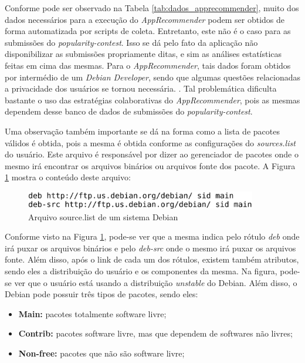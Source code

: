   Conforme pode ser observado na Tabela \ref{tab:dados_apprecommender}, muito dos dados
  necessários para a execução do \textit{AppRecommender} podem ser obtidos de forma automatizada
  por scripts de coleta. Entretanto, este não é o caso para as submissões do
  \textit{popularity-contest}. Isso se dá pelo fato da aplicação não disponibilizar as submissões
propriamente ditas, e sim as análises estatísticas feitas em cima das mesmas. Para o
\textit{AppRecommender}, tais dados foram obtidos por intermédio de um
\textit{Debian Developer}, sendo que algumas questões relacionadas a privacidade dos usuários se tornou necessária.
\cite{araujo2011apprecommender}. Tal problemática dificulta bastante o uso das
estratégias colaborativas do \textit{AppRecommender}, pois as mesmas dependem desse banco de dados
de submissões do \textit{popularity-contest}.

Uma observação também importante se dá na forma como a lista de pacotes válidos
é obtida, pois a mesma é obtida conforme as configurações do \textit{sources.list} do usuário. Este arquivo é responsável
por dizer ao gerenciador de pacotes onde o mesmo irá encontrar os arquivos binários ou
arquivos fonte dos pacote. A Figura \ref{fig:source_list} mostra o conteúdo deste arquivo:
\\

\begin{figure}[h]
  \centering
  \includegraphics[width=0.9\textwidth]{figuras/source_list.eps}
  \caption{Arquivo source.list de um sistema Debian}
  \label{fig:source_list}
\end{figure}

Conforme visto na Figura \ref{fig:source_list}, pode-se ver que a mesma indica
pelo rótulo \textit{deb} onde irá puxar os arquivos binários e pelo
\textit{deb-src} onde o mesmo irá puxar os arquivos fonte. Além disso, após o
link de cada um dos rótulos, existem também atributos, sendo eles a distribuição
do usuário e os componentes da mesma. Na figura, pode-se ver que o usuário está
usando a distribuição \textit{unstable} do Debian. Além disso, o Debian pode possuir três
tipos de pacotes, sendo eles:

\begin{itemize}
    \item \textbf{Main:} pacotes totalmente software livre;
    \item \textbf{Contrib:} pacotes software livre, mas que dependem de
        softwares não livres;
    \item \textbf{Non-free:} pacotes que não são software livre;
\end{itemize}

